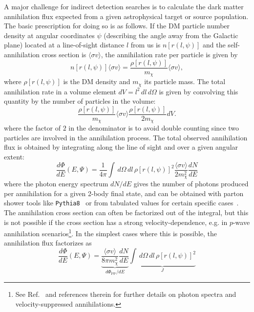 A major challenge for indirect detection searches is to calculate the dark matter annihilation flux expected from a given astrophysical target or source population. The basic prescription for doing so is as follows. If the DM particle number density at angular coordinates $\psi$ (describing the angle away from the Galactic plane) located at a line-of-sight distance $l$ from us is $n[r(l,\psi)]$ and the self-annihilation cross section is $\langle\sigma v\rangle$, the annihilation rate per particle is given by
\begin{equation}
n[r(l,\psi)]\langle\sigma v\rangle = \frac{\rho[r(l,\psi)]}{m_\chi}\langle\sigma v\rangle,
\end{equation}
where $\rho[r(l,\psi)]$ is the DM density and $m_\chi$ its particle mass. The total annihilation rate in a volume element $dV = l^2\,dl\,d\Omega$ is given by convolving this quantity by the number of particles in the volume:
\begin{equation}
\frac{\rho[r(l,\psi)]}{m_\chi}\langle\sigma v\rangle \frac{\rho[r(l,\psi)]}{2m_\chi}dV.
\end{equation}
where the factor of $2$ in the denominator is to avoid double counting since two particles are involved in the annihilation process. The total observed annihilation flux is obtained by integrating along the line of sight and over a given angular extent:
\begin{equation}
\frac{d\Phi}{dE}(E,\Psi) = \frac{1}{4\pi}\int\,d\Omega\,dl\,\rho[r(l,\psi)]^2\frac{\langle\sigma v\rangle}{2m_\chi^2}\frac{dN}{dE}
\end{equation}
where the photon energy spectrum $dN/dE$ gives the number of photons produced per annihilation for a given 2-body final state, and can be obtained with parton shower tools like \texttt{Pythia8}~\cite{Sjostrand:2007gs} or from tabulated values for certain specific cases~\cite{Cirelli:2010xx}. The annihilation cross section can often be factorized out of the integral, but this is not possible if the cross section has a strong velocity-dependence, e.g. in $p$-wave annihilation scenarios\footnote{See Ref.~\cite{Slatyer:2017sev} and references therein for further details on photon spectra and velocity-suppressed annihilations.}. %
In the simplest cases where this is possible, the annihilation flux factorizes as
\begin{equation}
\frac{d\Phi}{dE}(E,\Psi) = \underbrace{\frac{\langle\sigma v\rangle}{8\pi m_\chi^2}\frac{dN}{dE}}_{d\Phi_\mathrm{PP}/dE}\underbrace{\int\,d\Omega\,dl\,\rho[r(l,\psi)]^2}_J
\end{equation}
